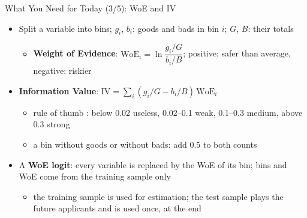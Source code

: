 \begin{frame}{What You Need for Today (3/5): WoE and IV}
\itemsize{\small}
\begin{itemize}
    \item Split a variable into bins; $g_i$, $b_i$: goods and bads in bin $i$; $G$, $B$: their totals
    \begin{itemize}
        \item \textbf{Weight of Evidence}: $\mathrm{WoE}_i = \ln\dfrac{g_i/G}{b_i/B}$; positive: safer than average, negative: riskier
    \end{itemize}
    \item \textbf{Information Value}: $\mathrm{IV} = \sum_i (g_i/G - b_i/B)\,\mathrm{WoE}_i$
    \begin{itemize}
        \item rule of thumb : below 0.02 useless, 0.02--0.1 weak, 0.1--0.3 medium, above 0.3 strong
        \item a bin without goods or without bads: add 0.5 to both counts
    \end{itemize}
    \item A \textbf{WoE logit}: every variable is replaced by the WoE of its bin; bins and WoE come from the training sample only
    \begin{itemize}
        \item the training sample is used for estimation; the test sample plays the future applicants and is used once, at the end
    \end{itemize}
\end{itemize}
\end{frame}

